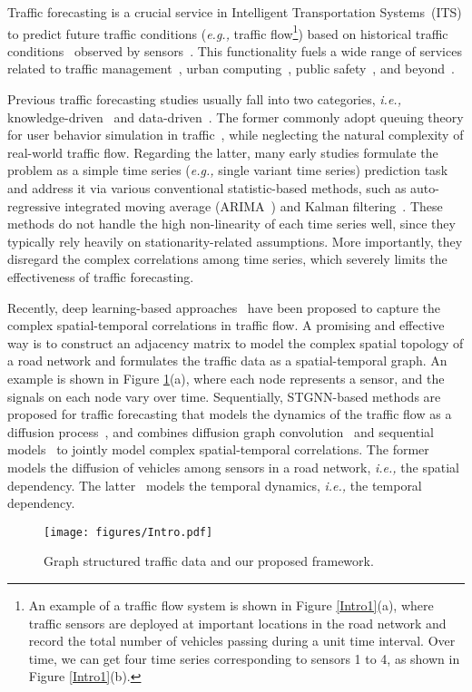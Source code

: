 \documentclass[sigconf, nonacm]{acmart}
\newcommand{\eg}{\textit{e.g.,}\xspace}
\newcommand{\ie}{\textit{i.e.,}\xspace}
\begin{document}
{\color{black}
Traffic forecasting is a crucial service in Intelligent Transportation Systems~(ITS) to predict future traffic conditions (\eg traffic flow\footnote{{\color{black}An example of a traffic flow system is shown in Figure \ref{Intro1}(a), where traffic sensors are deployed at important locations in the road network and record the total number of vehicles passing during a unit time interval. 
Over time, we can get four time series corresponding to sensors 1 to 4, as shown in Figure \ref{Intro1}(b).}})
based on historical traffic conditions~\cite{2020GMAN} observed by sensors~\cite{ICDE21S,VLDB21MDTP}.
This functionality fuels a wide range of services related to traffic management~\cite{TrafficManagement}, urban computing~\cite{UrbanComputing}, public safety~\cite{PublicSafty}, and beyond~\cite{incident, Demand, Travel, qian2020cabin}.


Previous traffic forecasting studies usually fall into two categories, \ie knowledge-driven~\cite{cascetta2013transportation} and data-driven~\cite{ARIMAKarman1,2014GRU,2017DCRNN,GWNet}.
The former commonly adopt queuing theory for user behavior simulation in traffic~\cite{cascetta2013transportation}, while neglecting the natural complexity of real-world traffic flow.
Regarding the latter, many early studies formulate the problem as a simple time series (\eg single variant time series) prediction task~\cite{2021DGCRN}
and address it via various conventional statistic-based methods, such as auto-regressive integrated moving average (ARIMA~\cite{ARIMA}) and Kalman filtering~\cite{ARIMAKarman1}.
These methods do not handle the high non-linearity of each time series well,
since they typically rely heavily on stationarity-related assumptions.
More importantly, they disregard the complex correlations among time series, which severely limits the effectiveness of traffic forecasting.

Recently, deep learning-based approaches~\cite{lv2014traffic, 2018DMVST, 2017DCRNN} have been proposed to capture the complex spatial-temporal correlations in traffic flow. 
A promising and effective way is to construct an adjacency matrix to model the complex spatial topology of a road network and formulates the traffic data as a spatial-temporal graph.
An example is shown in Figure \ref{Intro}(a), where each node represents a sensor, and the signals on each node vary over time.
Sequentially, STGNN-based methods are proposed for traffic forecasting that models the dynamics of the traffic flow as a diffusion process~\cite{2017DCRNN, GWNet}, and combines diffusion graph convolution~\cite{2017DCRNN} and sequential models~\cite{2016TCN, 2014GRU} to jointly model complex spatial-temporal correlations.
The former~\cite{2017DCRNN} models the diffusion of vehicles among sensors in a road network, \ie the spatial dependency.
The latter~\cite{2016TCN, 2014GRU} models the temporal dynamics, \ie the temporal dependency.
\color{black}
\begin{figure}[t]
  \centering
\texttt{[image: figures/Intro.pdf]}
  \caption{
  {\color{black}Graph structured traffic data and our proposed framework.}
  }
  \label{Intro}
\end{figure}

}
\end{document}
